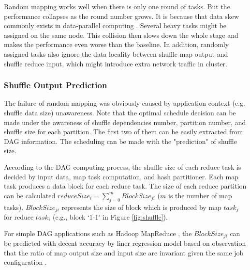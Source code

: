 Random mapping works well when there is only one round of tasks. But the performance collapses as the round number grows. It is because that data skew commonly exists in data-parallel computing \cite{skewtune, reining, gufler2012load}. Several heavy tasks might be assigned on the same node. This collision then slows down the whole stage and makes the performance even worse than the baseline. In addition, randomly assigned tasks also ignore the data locality between shuffle map output and shuffle reduce input, which might introduce extra network traffic in cluster.

\subsubsection{Shuffle Output Prediction}\label{shuffleprediction}
The failure of random mapping was obviously caused by application context (e.g. shuffle data size) unawareness. Note that the optimal schedule decision can be made under the awareness of shuffle dependencies number, partition number, and shuffle size for each partition. The first two of them can be easily extracted from DAG information. The scheduling can be made with the "prediction" of shuffle size.

According to the DAG computing process, the shuffle size of each reduce task is decided by input data, map task computation, and hash partitioner. Each map task produces a data block for each reduce task. The size of each reduce partition can be calculated $reduceSize_i = \sum_{j=0}^{m} {BlockSize_{ji}}$ ($m$ is the number of map tasks). $BlockSize_{ji}$ represents the size of block which is produced by map $task_j$ for reduce $task_i$ (e.g., block `1-1' in Figure \ref{fig:shuffle}).

For simple DAG applications such as Hadoop MapReduce \cite{mapreduce}, the $BlockSize_{ji}$ can be predicted with decent accuracy by liner regression model based on observation that the ratio of map output size and input size are invariant given the same job configuration \cite{ishuffle, predict}.

